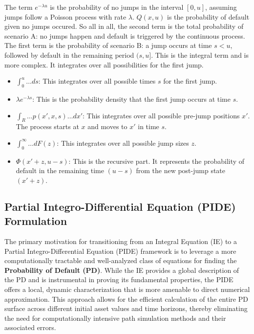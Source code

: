\documentclass[11pt,twoside,openright]{report}
\begin{document}
The term $e^{-\lambda u}$ is the probability of no jumps in the interval $[0, u]$, assuming jumps follow a Poisson process with rate $\lambda$. $Q(x, u)$ is the probability of default given no jumps occured. So all in all, the second term is the total probability of scenario A: no jumps happen and default is triggered by the continuous process.\\
The first term is the probability of scenario B: a jump occurs at time $s < u$, followed by default in the remaining period $(s, u]$. This is the integral term and is more complex. It integrates over all possibilities for the first jump.
\begin{itemize}
    \item $\int_0^u \dots ds$: This integrates over all possible times $s$ for the first jump.
    \item $\lambda e^{-\lambda s}$: This is the probability density that the first jump occurs at time $s$.
    \item $\int_R \dots p(x', x, s) \dots dx'$: This integrates over all possible pre-jump positions $x'$. The process starts at $x$ and moves to $x'$ in time $s$.
    \item $\int_0^\infty \dots dF(z)$: This integrates over all possible jump sizes $z$.
    \item $\Phi(x' + z, u - s)$: This is the recursive part. It represents the probability of default in the remaining time $(u-s)$ from the new post-jump state $(x'+z)$.
\end{itemize}

\subsection{Partial Integro-Differential Equation (PIDE) Formulation}

The primary motivation for transitioning from an Integral Equation (IE) to a Partial Integro-Differential Equation (PIDE) framework is to leverage a more computationally tractable and well-analyzed class of equations for finding the \textbf{Probability of Default (PD)}. While the IE provides a global description of the PD and is instrumental in proving its fundamental properties, the PIDE offers a local, dynamic characterization that is more amenable to direct numerical approximation. This approach allows for the efficient calculation of the entire PD surface across different initial asset values and time horizons, thereby eliminating the need for computationally intensive path simulation methods and their associated errors.
\end{document}
